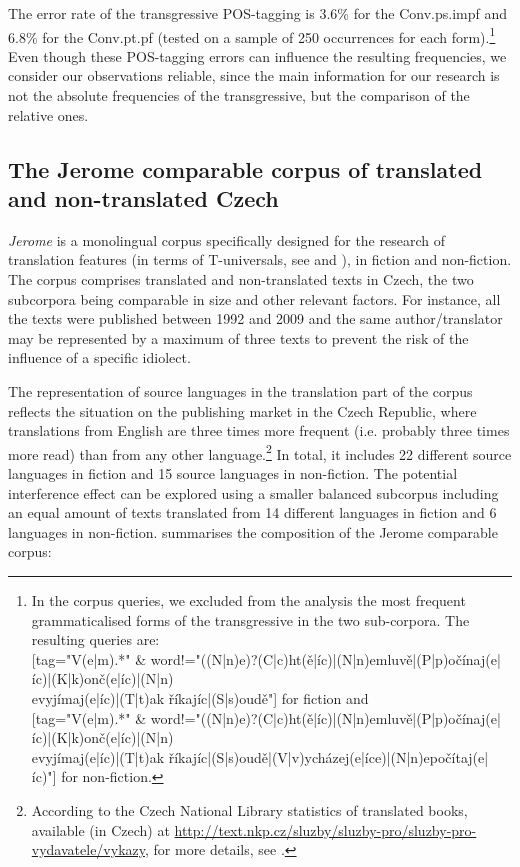 \documentclass[output=paper,russian]{langsci/langscibook}
\begin{document}
The error rate of the transgressive POS-tagging is 3.6\% for the Conv.ps.impf and 6.8\% for the Conv.pt.pf (tested on a sample of 250 occurrences for each form).\footnote{In the corpus queries, we excluded from the analysis the most frequent grammaticalised forms of the transgressive in the two sub-corpora. The resulting queries are:\\{}
[tag="V(e|m).*" \& word!="((N|n)e)?(C|c)ht(ě|íc)|(N|n)emluvě|(P|p)očínaj(e|íc)|(K|k)onč(e|íc)|(N|n)\\
evyjímaj(e|íc)|(T|t)ak říkajíc|(S|s)oudě"] for fiction and\\{}
[tag="V(e|m).*" \& word!="((N|n)e)?(C|c)ht(ě|íc)|(N|n)emluvě|(P|p)očínaj(e|íc)|(K|k)onč(e|íc)|(N|n)\\evyjímaj(e|íc)|(T|t)ak říkajíc|(S|s)oudě|(V|v)ycházej(e|íce)|(N|n)epočítaj(e|íc)"] for non-fiction.} Even though these POS-tagging errors can influence the resulting frequencies, we consider our observations reliable, since the main information for our research is not the absolute frequencies of the transgressive, but the comparison of the relative ones.

\subsection{The Jerome comparable corpus of translated and non-translated Czech}\label{olga:je}

\textit{Jerome} \parencites{chlumska13}{chlumska17} is a monolingual corpus specifically designed for the research of translation features (in terms of T-universals, see \textcite{chesterman04} and ), in fiction and non-fiction. The corpus comprises translated and non-translated texts in Czech, the two subcorpora being comparable in size and other relevant factors. For instance, all the texts were published between 1992 and 2009 and the same author\slash translator may be represented by a maximum of three texts to prevent the risk of the influence of a specific idiolect.

The representation of source languages in the translation part of the corpus reflects the situation on the publishing market in the Czech Republic, where translations from English are three times more frequent (i.e. probably three times more read) than from any other language.\footnote{According to the Czech National Library statistics of translated books, available (in Czech) at \url{http://text.nkp.cz/sluzby/sluzby-pro/sluzby-pro-vydavatele/vykazy}, for more details, see \textcite[313]{cvrchl15}.} In total, it includes 22 different source languages in fiction and 15 source languages in non-fiction. The potential interference effect can be explored using a smaller balanced subcorpus including an equal amount of texts translated from 14 different languages in fiction and 6 languages in non-fiction.  summarises the composition of the Jerome comparable corpus:
\end{document}
